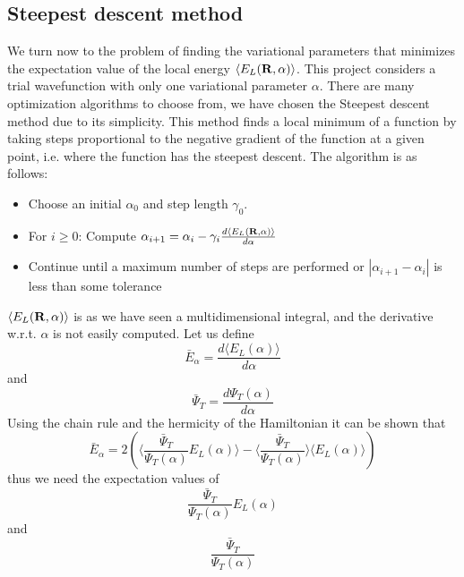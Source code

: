 \documentclass[english, a4paper]{article}
\begin{document}
\subsection{Steepest descent method}

We turn now to the problem of finding the variational parameters that minimizes the expectation value
of the local energy $\langle E_L({\bf R}, \alpha) \rangle$. This project considers a trial wavefunction with only one 
variational parameter $\alpha$.
There are many optimization algorithms to choose from, we have chosen the Steepest 
descent method due to its simplicity. This method finds a local minimum of a function by taking steps proportional 
to the negative gradient of the function at a given point, i.e. where the function has the steepest descent.
The algorithm is as follows:
\begin{itemize}
 \item Choose an initial $\alpha_0$ and step length $\gamma_0$.
 \item For $i \geq 0$: Compute $\alpha_{i+1} = \alpha_i - \gamma_i \frac{d \langle E_L({\bf R}, \alpha) \rangle}{d\alpha}$
 \item Continue until a maximum number of steps are performed or $|\alpha_{i+1} - \alpha_{i}|$ is 
       less than some tolerance
\end{itemize}
$\langle E_L({\bf R}, \alpha) \rangle$ is as we have seen a multidimensional integral, and the derivative w.r.t. $\alpha$
is not easily computed. Let us define
\begin{equation}
 \bar{E}_\alpha = \frac{d \langle E_L(\alpha) \rangle}{d\alpha}
\end{equation}
and 
\begin{equation}
 \bar{\Psi}_T = \frac{d \Psi_T(\alpha)}{d\alpha}
\end{equation}
Using the chain rule and the hermicity of the Hamiltonian it can be shown that
\begin{equation}
 \bar{E}_\alpha = 2 \left( \Bigr\langle \frac{\bar{\Psi}_T}{\Psi_T(\alpha)} E_L(\alpha) \Bigr\rangle 
 - \Bigr\langle \frac{\bar{\Psi}_T}{\Psi_T(\alpha)}\Bigr\rangle \langle E_L(\alpha) \rangle   \right)
 \label{localenergyalpha}
\end{equation}
thus we need the expectation values of
\begin{equation}
 \frac{\bar{\Psi}_T}{\Psi_T(\alpha)} E_L(\alpha)
 \label{waveenergy}
\end{equation}
and 
\begin{equation}
 \frac{\bar{\Psi}_T}{\Psi_T(\alpha)}
 \label{wavederivative}
\end{equation}
\end{document}
